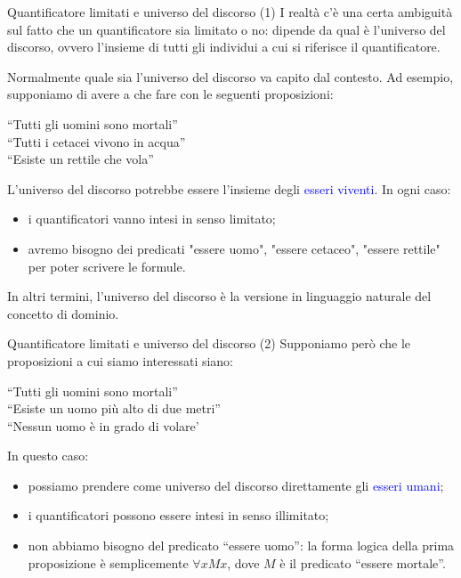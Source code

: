 \documentclass[aspectratio=169,10pt,dvipsnames,xcolor=table]{beamer}
\begin{document}
\begin{frame}{Quantificatore limitati e universo del discorso (1)}
    I realtà c'è una certa ambiguità sul fatto che un quantificatore sia limitato o no: dipende da qual è l'\alert{universo del discorso}, ovvero l'insieme di tutti gli individui a cui si riferisce il quantificatore.

    \medskip
    Normalmente quale sia l'universo del discorso va capito dal contesto. Ad esempio, supponiamo di avere a che fare con le seguenti proposizioni:
    \begin{center}
        ``Tutti gli uomini sono mortali''\\
        ``Tutti i cetacei vivono in acqua''\\
        ``Esiste un rettile che vola''
    \end{center}
    L'universo del discorso potrebbe essere l'insieme degli \textcolor{blue}{esseri viventi}. In ogni caso:
    \begin{itemize}
        \item i quantificatori vanno intesi in senso limitato;
        \item avremo bisogno dei predicati "essere uomo", "essere cetaceo", "essere rettile" per poter scrivere le formule.
    \end{itemize}
    \medskip
    In altri termini, l'universo del discorso è la versione in linguaggio naturale del concetto di dominio.
\end{frame}

\begin{frame}{Quantificatore limitati e universo del discorso (2)}
    Supponiamo però che le proposizioni a cui siamo interessati siano:
    \begin{center}
        ``Tutti gli uomini sono mortali''\\
        ``Esiste un uomo più alto di due metri''\\
        ``Nessun uomo è in grado di volare'
    \end{center}
    In questo caso:
    \begin{itemize}
        \item possiamo prendere come universo del discorso direttamente gli \textcolor{blue}{esseri umani};
        \item i quantificatori possono essere intesi in senso illimitato;
        \item non abbiamo bisogno del predicato ``essere uomo'': la forma logica della prima proposizione è semplicemente $\forall x Mx$, dove $M$ è il predicato ``essere mortale''.
    \end{itemize}
\end{frame}
\end{document}
